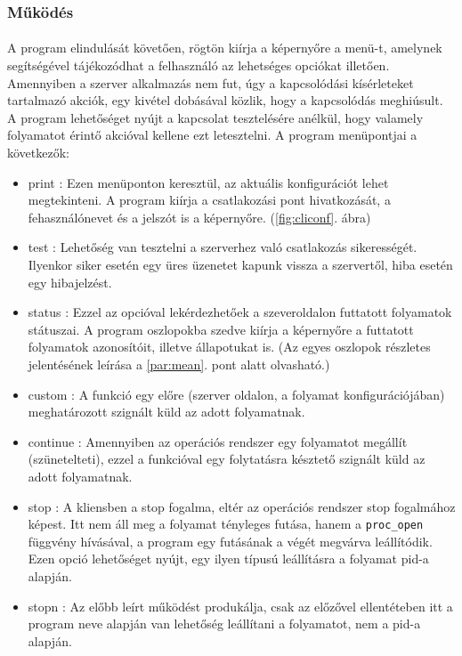 \documentclass[12pt]{report}
\begin{document}
  \subsubsection{Működés}\label{sec:cli_funcs}
  \paragraph{}
  A program elindulását követően, rögtön kiírja a képernyőre a menü-t, amelynek segítségével tájékozódhat a felhasználó az lehetséges opciókat illetően. Amennyiben a szerver alkalmazás nem fut, úgy a kapcsolódási kísérleteket tartalmazó akciók, egy kivétel dobásával közlik, hogy a kapcsolódás meghiúsult. A program lehetőséget nyújt a kapcsolat tesztelésére anélkül, hogy valamely folyamatot érintő akcióval kellene ezt letesztelni.
A program menüpontjai a következők:
\begin{itemize}
\item print : Ezen menüponton keresztül, az aktuális konfigurációt lehet megtekinteni. A program kiírja a csatlakozási pont hivatkozását, a fehasználónevet és a jelszót is a képernyőre. (\ref{fig:cliconf}. ábra)
\item test : Lehetőség van tesztelni a szerverhez való csatlakozás sikerességét. Ilyenkor siker esetén egy üres üzenetet kapunk vissza a szervertől, hiba esetén egy hibajelzést.
\item status : Ezzel az opcióval lekérdezhetőek a szeveroldalon futtatott folyamatok státuszai. A program oszlopokba szedve kiírja a képernyőre a futtatott folyamatok azonosítóit, illetve állapotukat is. (Az egyes oszlopok részletes jelentésének leírása a \ref{par:mean}. pont alatt olvasható.)
\item custom : A funkció egy előre (szerver oldalon, a folyamat konfigurációjában) meghatározott szignált küld az adott folyamatnak.
\item continue : Amennyiben az operációs rendszer egy folyamatot megállít (szünetelteti), ezzel a funkcióval egy folytatásra késztető szignált küld az adott folyamatnak.
\item stop : A kliensben a stop fogalma, eltér az operációs rendszer stop fogalmához képest. Itt nem áll meg a folyamat tényleges futása, hanem a \verb|proc_open| függvény hívásával, a program egy futásának a végét megvárva leállítódik. Ezen opció lehetőséget nyújt, egy ilyen típusú leállításra a folyamat pid-a alapján.
\item stopn : Az előbb leírt működést produkálja, csak az előzővel ellentéteben itt a program neve alapján van lehetőség leállítani a folyamatot, nem a pid-a alapján.

\end{itemize}
\end{document}

